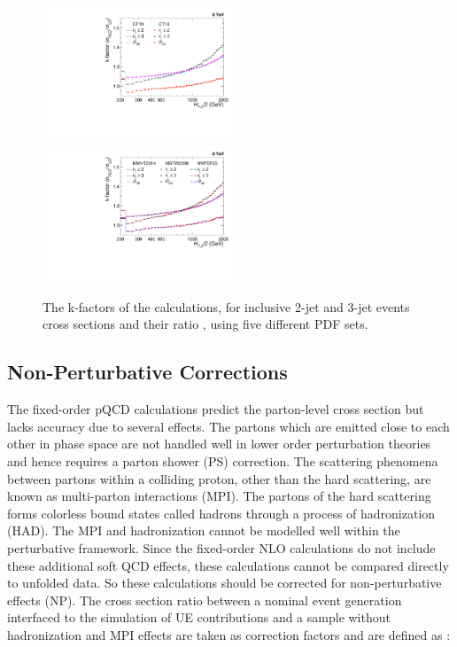 \begin{figure}[!htbp]
 \begin{center}
 \hspace*{-5mm}\includegraphics[width=0.51\textwidth]{Plots_HT_2_150/Kfactor_all_1.pdf}%
 ~~\includegraphics[width=0.51\textwidth]{Plots_HT_2_150/Kfactor_all_2.pdf}
 \caption{The k-factors of the \NLOJETPP calculations, for inclusive 2-jet and 3-jet events cross sections and their ratio \ratio, using five different PDF sets.}
 \label{fig:kfactor}
 \end{center}
\end{figure}

\subsection{Non-Perturbative Corrections}
\label{sec:NPcorr}

The fixed-order pQCD calculations predict the parton-level cross section but lacks accuracy due to several effects. The partons which are emitted close to each other in phase space are not handled well in lower order perturbation theories and hence requires a parton shower (PS) correction. The scattering phenomena between partons within a colliding proton, other than the hard scattering, are known as multi-parton interactions (MPI). The partons of the hard scattering forms colorless bound states called hadrons through a process of hadronization (HAD). The MPI and hadronization cannot be modelled well within the perturbative framework. Since the fixed-order NLO calculations do not include these additional soft QCD effects, these calculations cannot be compared directly to unfolded data. So these calculations should be corrected for non-perturbative effects (NP). The cross section ratio between a nominal event generation interfaced to the simulation of UE contributions and a sample without hadronization and MPI effects are taken as correction factors and are defined as : 

